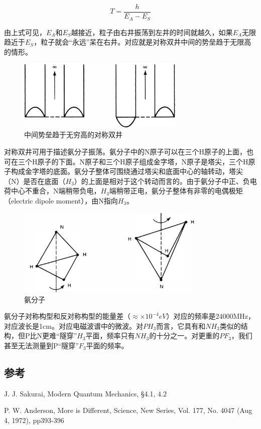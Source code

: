 \begin{equation}
T = \frac{h }{E_A - E_S}
\end{equation}

由上式可见，$E_A$和$E_S$越接近，粒子由右井振荡到左井的时间就越久，如果$E_A$无限趋近于$E_S$，粒子就会“永远”呆在右井。对应就是对称双井中间的势垒趋于无限高的情形。

\begin{figure}[htbp]
\begin{center}
\includegraphics[width=8cm]{Symmetry/infinitedoublewell.png}
\caption{中间势垒趋于无穷高的对称双井}
\end{center}
\end{figure}

对称双井可用于描述氨分子振荡。氨分子中的N原子可以在三个H原子的上面，也可在三个H原子的下面。N原子和三个H原子组成金字塔，N原子是塔尖，三个H原子构成金字塔的底面。氨分子整体可围绕通过塔尖和底面中心的轴转动，塔尖（N）是否在底面（$H_3$）的上面是相对于这个转动而言的。由于氨分子中正、负电荷中心不重合，N端稍带负电，$H_3$端稍带正电，氨分子整体有非零的电偶极矩（electric dipole moment），由N指向$H_3$。

\begin{figure}[htbp]
\begin{center}
\includegraphics[width=9cm]{Symmetry/amoniamolecule.png}
\caption{氨分子}
\end{center}
\end{figure}

氨分子对称构型和反对称构型的能量差（$\approx  \times 10^{-4} eV$）对应的频率是$24000$MHz，对应波长是1cm。对应电磁波谱中的微波。对$PH_3$而言，它具有和$NH_3$类似的结构，但P比N更难“隧穿”$H_3$平面，频率只有$NH_3$的十分之一。对更重的$PF_3$，我们甚至无法测量到P“隧穿”$F_3$平面的频率。

\subsection*{参考}

J. J. Sakurai, Modern Quantum Mechanics, \S 4.1, 4.2

P. W. Anderson, More is Different, Science, New Series, Vol. 177, No. 4047 (Aug 4, 1972), pp393-396